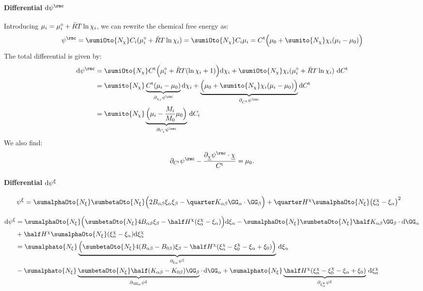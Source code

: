 \paragraph{Differential $\rmd\psic$} \label{app:dpsic} %

Introducing $\mu_i=\mu_{i}^{\circ}+\bar{R}T\ln\chi_{i}$, we can rewrite the chemical free energy as:
\begin{align}
  \psic  = \sumiOto{\Nchi} C_i (\munordi+\RT\ln\chii) = \sumiOto{\Nchi} C_i \mui = \Ct \Big( \mu_0 + \sumito{\Nchi}\chii(\mu_i-\mu_0) \Big)
\end{align}
The total differential is given by:
\begin{align}
  \begin{split}
  \rmd\psic &= \sumiOto{\Nchi} \Ct\Big(\munord_i + \RT(\ln{\chii}+1) \Big) \rmd\chii
           + \sumiOto{\Nchi} \chii(\munordi+\RT\ln\chii) \ \rmd\Ct 
          \\
          &= \sumito{\Nchi} \underbrace{\Ct (\mu_i - \mu_0) }_{\partial_{\chii}\psic} \rmd\chii + \underbrace{\Big( \mu_0 + \sumito{\Nchi}\chii(\mu_i-\mu_0) \Big) }_{\dCt\psic} \rmd \Ct
          \\
          &= \sumito{\Nchi} \underbrace{\Big(\mu_i - \frac{M_i}{M_0}\mu_0\Big)}_{\dCi\psic} \, \rmd C_i 
  \end{split}
\end{align}
We also find:
\begin{align}
  \dCt\psic - \frac{\dchiul\psic\cdot\chiul}{\Ct} = \mu_0.
\end{align}


\paragraph{Differential ${\rm d}\psi^{\xi}$} \label{app:dpsixi} %

\begin{align}
  \psixi &= \sumalphaOto{\Nxi} \sumbetaOto{\Nxi} \Big(2\Bab\xia\xib - \quarter \Kab \GGa\cdot\GGb \Big) 
  + \quarter\Hchi \sumalphaOto{\Nxi}\big(\xichia-\xia\big)^2
\end{align}

\begin{align}
  \begin{aligned}
    \rmd\psixi &= \sumalphaOto{\Nxi} \Big(\sumbetaOto{\Nxi} 4 \Bab \xib  - \half \Hchi (\xichia-\xia) \Big) \rmd \xia 
    - \sumalphaOto{\Nxi} \sumbetaOto{\Nxi}\half\Kab\GGb \cdot \rmd \GGa \\
    & + \half \Hchi \sumalphaOto{\Nxi}(\xichia-\xia) \rmd \xichia\\
    &= \sumalphato{\Nxi} \underbrace{\Big(\sumbetaOto{\Nxi} 4 (\Bab-B_{0\beta}) \xib - \half \Hchi(\xichia-\xichi_0-\xia+\xi_0)\Big)}_{\dxia\psixi} \, \rmd \xia \\
    &- \sumalphato{\Nxi} \underbrace{\sumbetaOto{\Nxi} \half(\Kab-K_{0\beta})\GGb}_{\dGGa\psixi} \cdot\,\rmd\GGa + \sumalphato{\Nxi} \underbrace{\half \Hchi (\xichia-\xichi_0-\xia+\xi_0)}_{\dxichia\psixi} \, \rmd\xichia
  \end{aligned}
\end{align}

